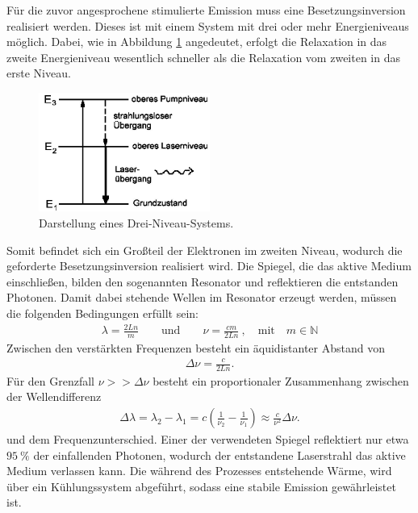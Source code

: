 Für die zuvor angesprochene stimulierte Emission muss eine Besetzungsinversion realisiert werden. Dieses ist mit einem System mit drei oder mehr Energieniveaus möglich. Dabei, wie in Abbildung \ref{theo1} angedeutet, erfolgt die Relaxation in das zweite Energieniveau wesentlich schneller als die Relaxation vom zweiten in das erste Niveau. 


\begin{figure}[H]
\centering
\includegraphics[width=0.5\textwidth]{ressources/Niveau.jpeg}
\caption{Darstellung eines Drei-Niveau-Systems. \cite{skript}}
\label{theo1}
\end{figure}


Somit befindet sich ein Großteil der Elektronen im zweiten Niveau, wodurch die geforderte Besetzungsinversion realisiert wird. Die Spiegel, die das aktive Medium einschließen, bilden den sogenannten Resonator und  reflektieren die entstanden Photonen. Damit dabei stehende Wellen im Resonator erzeugt werden,  müssen die folgenden Bedingungen erfüllt sein:
\begin{align}
	\lambda=\frac{2Ln}{m}\qquad \text{und} \qquad\nu=\frac{cm}{2Ln}\:, \quad \text{mit}  \quad m \in \mathbb{N} 
\end{align}
Zwischen den verstärkten Frequenzen besteht ein äquidistanter Abstand von
\begin{align}
	\Delta \nu=\frac{c}{2Ln}.
\end{align}
Für den Grenzfall $\nu >>\Delta\nu$ besteht ein proportionaler Zusammenhang zwischen der Wellendifferenz
\begin{align}
	\Delta \lambda =\lambda_2- \lambda_1=c\left(\frac{1}{\nu_2}-\frac{1}{\nu_1}\right) \approx \frac{c}{\nu^2}\Delta\nu.
	\label{eq:1}
\end{align}
und dem Frequenzunterschied. Einer der verwendeten Spiegel reflektiert nur etwa $\SI{95}{\percent}$ der einfallenden Photonen, wodurch der entstandene Laserstrahl das aktive Medium verlassen kann. Die während des Prozesses entstehende Wärme, wird über ein Kühlungssystem abgeführt, sodass eine stabile Emission gewährleistet ist.

